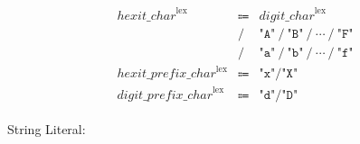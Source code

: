 \begin{align*}
\begin{array}{rcll}
        \mathit{hexit\_char}^\mathrm{lex}
        &\Coloneq &\mathit{digit\_char}^\mathrm{lex} \\
        &\mathrel{/} &\texttt{"A"} \mathrel{/} \texttt{"B"} \mathrel{/} \cdots \mathrel{/} \texttt{"F"} \\
        &\mathrel{/} &\texttt{"a"} \mathrel{/} \texttt{"b"} \mathrel{/} \cdots \mathrel{/} \texttt{"f"} \\
        \mathit{hexit\_prefix\_char}^\mathrm{lex}
        &\Coloneq &\texttt{"x"} \mathrel{/} \texttt{"X"} \\
        \mathit{digit\_prefix\_char}^\mathrm{lex}
        &\Coloneq &\texttt{"d"} \mathrel{/} \texttt{"D"}
    \end{array}
\end{align*}

String Literal:

